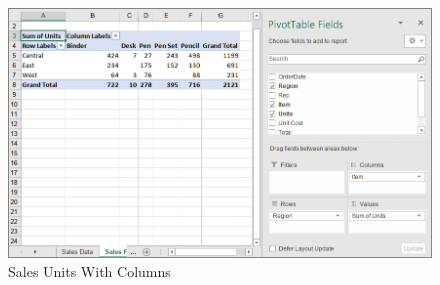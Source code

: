 \begin{figure}[H]
	\centering
	\includegraphics[width=\maxwidth{.95\linewidth}]{gfx/ch07_fig15}
	\caption{Sales Units With Columns}
	\label{07:fig15}
\end{figure}

